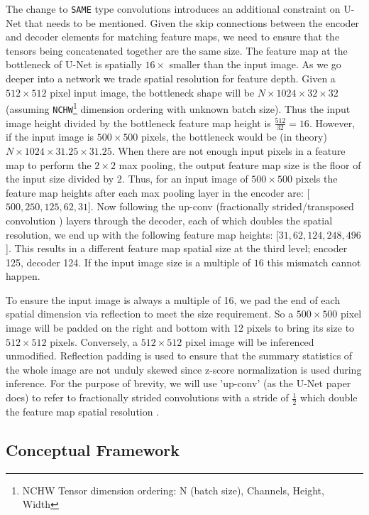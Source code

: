 \documentclass[runningheads]{llncs}
\begin{document}
The change to \texttt{SAME} type convolutions introduces an additional constraint on U-Net that needs to be mentioned. Given the skip connections between the encoder and decoder elements for matching feature maps, we need to ensure that the tensors being concatenated together are the same size. The feature map at the bottleneck of U-Net is spatially $16 \times$ smaller than the input image. 
As we go deeper into a network we trade spatial resolution for feature depth. Given a $512 \times 512$ pixel input image, the bottleneck shape will be $N \times 1024 \times 32 \times 32$ (assuming \texttt{NCHW}\footnote{NCHW Tensor dimension ordering: N (batch size), Channels, Height, Width} dimension ordering with unknown batch size). Thus the input image height divided by the bottleneck feature map height is $\frac{512}{32} = 16$. However, if the input image is $500 \times 500$ pixels, the bottleneck would be (in theory) $N \times 1024 \times 31.25 \times 31.25$. When there are not enough input pixels in a feature map to perform the $2 \times 2$ max pooling, the output feature map size is the floor of the input size divided by $2$. 
Thus, for an input image of $500 \times 500$ pixels the feature map heights after each max pooling layer in the encoder are: [$500, 250, 125, 62, 31$]. Now following the up-conv (fractionally strided/transposed convolution \cite{Dumoulin2018}) layers through the decoder, each of which doubles the spatial resolution, we end up with the following feature map heights: [$31, 62, 124, 248, 496$]. This results in a different feature map spatial size at the third level; encoder 125, decoder 124. If the input image size is a multiple of $16$ this mismatch cannot happen. 

To ensure the input image is always a multiple of 16, we pad the end of each spatial dimension via reflection to meet the size requirement. So a $500 \times 500$ pixel image will be padded on the right and bottom with 12 pixels to bring its size to $512 \times 512$ pixels. Conversely, a $512 \times 512$ pixel image will be inferenced unmodified. Reflection padding is used to ensure that the summary statistics of the whole image are not unduly skewed since z-score normalization is used during inference. 
For the purpose of brevity, we will use 'up-conv' (as the U-Net paper does) to refer to fractionally strided convolutions with a stride of $\frac{1}{2}$ which double the feature map spatial resolution \cite{Dumoulin2018}.

\subsection{Conceptual Framework}
\end{document}
